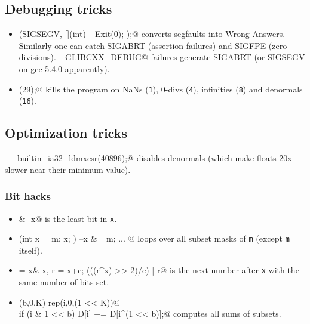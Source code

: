 \begin{multicols}{\Columns}
\subsection{Debugging tricks}
	\begin{itemize}
		\item \verb@signal(SIGSEGV, [](int) { _Exit(0); });@ converts segfaults into Wrong Answers.
			Similarly one can catch SIGABRT (assertion failures) and SIGFPE (zero divisions).
			\verb@_GLIBCXX_DEBUG@ failures generate SIGABRT (or SIGSEGV on gcc 5.4.0 apparently).
		\item \verb@feenableexcept(29);@ kills the program on NaNs (\texttt 1), 0-divs (\texttt 4), infinities (\texttt 8) and denormals (\texttt{16}).
	\end{itemize}

\subsection{Optimization tricks}
	\verb@__builtin_ia32_ldmxcsr(40896);@ disables denormals (which make floats 20x slower near their minimum value).
	\subsubsection{Bit hacks}
		\begin{itemize}
			\item \verb@x & -x@ is the least bit in \texttt{x}.
			\item \verb@for (int x = m; x; ) { --x &= m; ... }@ loops over all subset masks of \texttt{m} (except \texttt{m} itself).
			\item \verb@c = x&-x, r = x+c; (((r^x) >> 2)/c) | r@ is the next number after \texttt{x} with the same number of bits set.
			\item \verb@rep(b,0,K) rep(i,0,(1 << K))@ \\ \verb@  if (i & 1 << b) D[i] += D[i^(1 << b)];@ computes all sums of subsets.
		\end{itemize}

\end{multicols}
